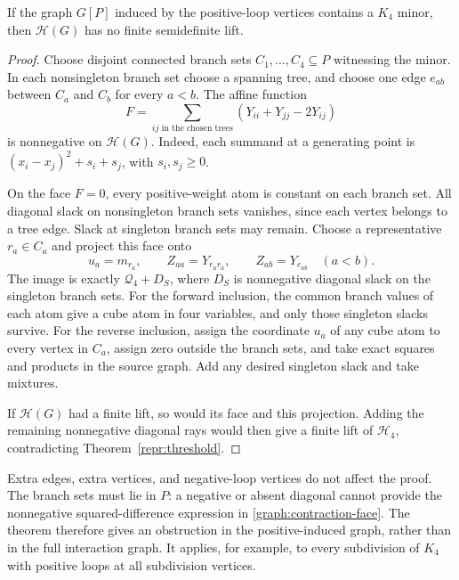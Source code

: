 \begin{theorem}\label{graph:k4}
If the graph $G[P]$ induced by the positive-loop vertices contains a
$K_4$ minor, then $\mathcal H(G)$ has no finite semidefinite lift.
\end{theorem}
\begin{proof}
Choose disjoint connected branch sets $C_1,\ldots,C_4\subseteq P$ witnessing
the minor. In each nonsingleton branch set choose a spanning tree, and
choose one edge $e_{ab}$ between $C_a$ and $C_b$ for every $a<b$.
The affine function
\begin{equation}\label{graph:contraction-face}
 F=\sum_{ij\text{ in the chosen trees}}
       (Y_{ii}+Y_{jj}-2Y_{ij})
\end{equation}
is nonnegative on $\mathcal H(G)$. Indeed, each summand at a generating
point is $(x_i-x_j)^2+s_i+s_j$, with $s_i,s_j\geq0$.

On the face $F=0$, every positive-weight atom is constant on each branch
set. All diagonal slack on nonsingleton branch sets vanishes, since each
vertex belongs to a tree edge. Slack at singleton branch sets may remain.
Choose a representative $r_a\in C_a$ and project this face onto
\[
 u_a=m_{r_a},\qquad Z_{aa}=Y_{r_ar_a},\qquad
 Z_{ab}=Y_{e_{ab}}\quad(a<b).
\]
The image is exactly $\mathcal Q_4+D_S$, where $D_S$ is nonnegative
diagonal slack on the singleton branch sets. For the forward inclusion,
the common branch values of each atom give a cube atom in four variables,
and only those singleton slacks survive. For the reverse inclusion, assign
the coordinate $u_a$ of any cube atom to every vertex in $C_a$, assign zero
outside the branch sets, and take exact squares and products in the source
graph. Add any desired singleton slack and take mixtures.

If $\mathcal H(G)$ had a finite lift, so would its face and this projection.
Adding the remaining nonnegative diagonal rays would then give a finite
lift of $\mathcal H_4$, contradicting Theorem~\ref{repr:threshold}.
\end{proof}

Extra edges, extra vertices, and negative-loop vertices do not affect the
proof. The branch sets must lie in $P$: a negative or absent diagonal cannot
provide the nonnegative squared-difference expression in
\eqref{graph:contraction-face}. The theorem therefore gives an obstruction
in the positive-induced graph, rather than in the full interaction graph.
It applies, for example, to every subdivision of $K_4$ with positive loops
at all subdivision vertices.

